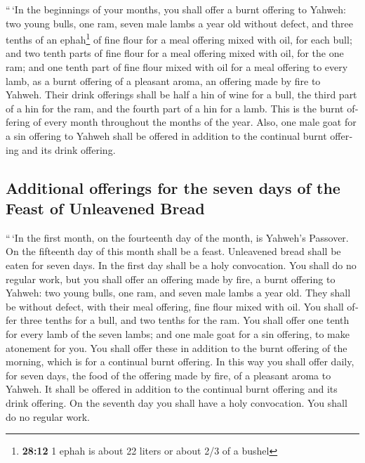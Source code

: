 \begin{paracol}{2}
\begin{otherlanguage}{english}
 ``\,`In the beginnings of your months, you shall offer a
burnt offering to Yahweh: two young bulls, one ram, seven male lambs a
year old without defect,  and three tenths of an
ephah\footnote{\textbf{28:12} 1 ephah is about 22 liters or about 2/3 of
  a bushel} of fine flour for a meal offering mixed with oil, for each
bull; and two tenth parts of fine flour for a meal offering mixed with
oil, for the one ram;  and one tenth part of fine flour
mixed with oil for a meal offering to every lamb, as a burnt offering of
a pleasant aroma, an offering made by fire to Yahweh. 
Their drink offerings shall be half a hin of wine for a bull, the third
part of a hin for the ram, and the fourth part of a hin for a lamb. This
is the burnt offering of every month throughout the months of the year.
 Also, one male goat for a sin offering to Yahweh shall
be offered in addition to the continual burnt offering and its drink
offering.

\hypertarget{additional-offerings-for-the-seven-days-of-the-feast-of-unleavened-bread}{%
\subsection{Additional offerings for the seven days of the Feast of
Unleavened
Bread}\label{additional-offerings-for-the-seven-days-of-the-feast-of-unleavened-bread}}

 ``\,`In the first month, on the fourteenth day of the
month, is Yahweh's Passover.  On the fifteenth day of
this month shall be a feast. Unleavened bread shall be eaten for seven
days.  In the first day shall be a holy convocation. You
shall do no regular work,  but you shall offer an
offering made by fire, a burnt offering to Yahweh: two young bulls, one
ram, and seven male lambs a year old. They shall be without defect,
 with their meal offering, fine flour mixed with oil. You
shall offer three tenths for a bull, and two tenths for the ram.
 You shall offer one tenth for every lamb of the seven
lambs;  and one male goat for a sin offering, to make
atonement for you.  You shall offer these in addition to
the burnt offering of the morning, which is for a continual burnt
offering.  In this way you shall offer daily, for seven
days, the food of the offering made by fire, of a pleasant aroma to
Yahweh. It shall be offered in addition to the continual burnt offering
and its drink offering.  On the seventh day you shall
have a holy convocation. You shall do no regular work.


\end{otherlanguage}
\end{paracol}
